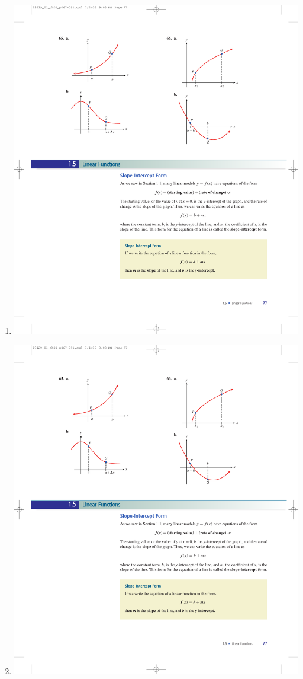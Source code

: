 \documentclass[10pt,]{book}
\theoremstyle{plain}
\theoremstyle{definition}
\theoremstyle{definition}
\theoremstyle{definition}
\theoremstyle{definition}
\numberwithin{equation}{part}
\begin{document}
\begin{exercisegroup}
\begin{multicols}{2}
\begin{enumerate}[label=*\alph**]
\item\hypertarget{li-1100}{}\includegraphics[width=0.8\linewidth]{images/fig-ex-1-4-66a}
%
\item\hypertarget{li-1101}{}\includegraphics[width=0.8\linewidth]{images/fig-ex-1-4-66b}
%
\end{enumerate}
\end{multicols}
%
\end{exercisegroup}
\par\smallskip\noindent
\typeout{************************************************}
\typeout{************************************************}
\end{document}
